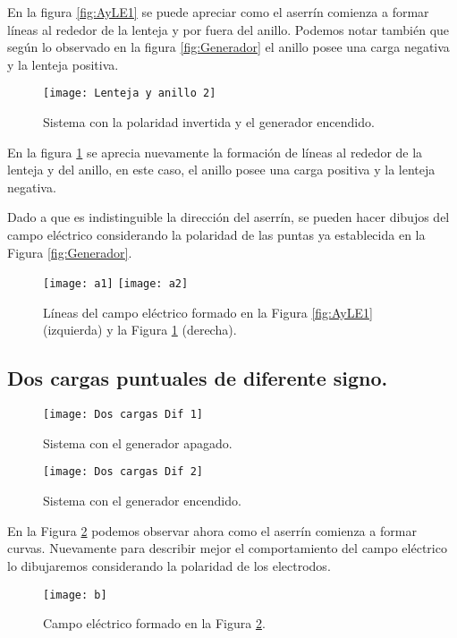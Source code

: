 \documentclass[spanish,10pt,a4paper,final,onecolumn,leqno,fleqn]{article}
\begin{document}
En la figura \ref{fig:AyLE1} se puede apreciar como el aserrín comienza a formar líneas al rededor de la lenteja y por fuera del anillo. Podemos notar también que según lo observado en la figura \ref{fig:Generador} el anillo posee una carga negativa y la lenteja positiva.

\newpage
\begin{figure}[h!]
	\centering
	\texttt{[image: Lenteja y anillo 2]}
	\caption{Sistema con la polaridad invertida y el generador encendido.}
	\label{fig:AyLE2}
\end{figure}

En la figura \ref{fig:AyLE2} se aprecia nuevamente la formación de líneas al rededor de la lenteja y del anillo, en este caso, el anillo posee una carga positiva y la lenteja negativa. 

Dado a que es indistinguible la dirección del aserrín, se pueden hacer dibujos del campo eléctrico considerando la polaridad de las puntas ya establecida en la Figura \ref{fig:Generador}.

\begin{figure}[h!]
	\centering
	\texttt{[image: a1]}
	\texttt{[image: a2]}
	\caption{Líneas del campo eléctrico formado en la Figura \ref{fig:AyLE1} (izquierda) y la Figura \ref{fig:AyLE2} (derecha).}
\end{figure}

\newpage
\subsection{Dos cargas puntuales de diferente signo.}

\begin{figure}[h!]
	\centering
	\texttt{[image: Dos cargas Dif 1]}
	\caption{Sistema con el generador apagado.}
\end{figure}

\begin{figure}[h!]
	\centering
	\texttt{[image: Dos cargas Dif 2]}
	\caption{Sistema con el generador encendido.}
	\label{fig:CDif1}
\end{figure}

En la Figura \ref{fig:CDif1} podemos observar ahora como el aserrín comienza a formar curvas. Nuevamente para describir mejor el comportamiento del campo eléctrico lo dibujaremos considerando la polaridad de los electrodos.

\begin{figure}[h!]
	\centering
	\texttt{[image: b]}
	\caption{Campo eléctrico formado en la Figura \ref{fig:CDif1}.}
	
\end{figure}
\end{document}

